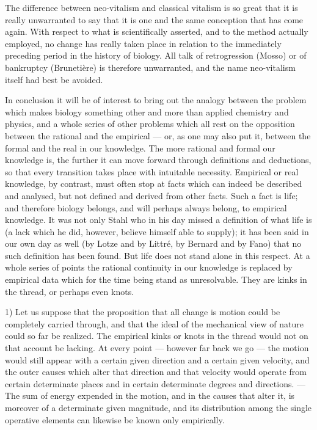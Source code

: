 \documentclass[12pt,a4paper]{article}
\begin{document}
The difference between neo-vitalism and classical vitalism is so great that it
is really unwarranted to say that it is one and the same conception that has
come again. With respect to what is scientifically asserted, and to the method
actually employed, no change has really taken place in relation to the
immediately preceding period in the history of biology. All talk of retrogression
(Mosso) or of bankruptcy (Brunetière) is therefore unwarranted, and the name
neo-vitalism itself had best be avoided.

\bigskip

In conclusion it will be of interest to bring out the analogy between the
problem which makes biology something other and more than applied chemistry and
physics, and a whole series of other problems which all rest on the opposition
between the rational and the empirical --- or, as one may also put it, between
the formal and the real in our knowledge. The more rational and formal our
knowledge is, the further it can move forward through definitions and
deductions, so that every transition takes place with intuitable necessity.
Empirical or real knowledge, by contrast, must often stop at facts which can
indeed be described and analysed, but not defined and derived from other facts.
Such a fact is life; and therefore biology belongs, and will perhaps always
belong, to empirical knowledge. It was not only Stahl who in his day missed a
definition of what life is (a lack which he did, however, believe himself able
to supply); it has been said in our own day as well (by Lotze and by Littré, by
Bernard and by Fano) that no such definition has been found. But life does not
stand alone in this respect. At a whole series of points
the rational continuity in our knowledge is replaced by empirical data which for
the time being stand as unresolvable. They are kinks in the thread, or perhaps
even knots.

1) Let us suppose that the proposition that all change is motion could be
completely carried through, and that the ideal of the mechanical view of nature
could so far be realized. The empirical kinks or knots in the thread would not
on that account be lacking. At every point --- however far back we go --- the
motion would still appear with a certain given direction and a certain given
velocity, and the outer causes which alter that direction and that velocity
would operate from certain determinate places and in certain determinate degrees
and directions. --- The sum of energy expended in the motion, and in the causes
that alter it, is moreover of a determinate given magnitude, and its distribution
among the single operative elements can likewise be known only empirically.
\end{document}
